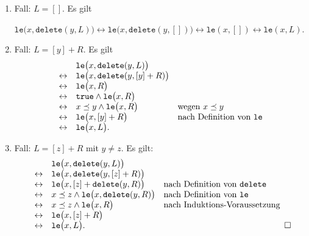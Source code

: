 \begin{enumerate}
\item Fall: $L = []$. Es gilt 

      \hspace*{1.3cm} 
      $\mathtt{le}\bigl(x, \mathtt{delete}(y,L)\bigr) \leftrightarrow \mathtt{le}\bigl(x, \mathtt{delete}(y,[])\bigr) 
       \leftrightarrow \mathtt{le}(x, []) \leftrightarrow \mathtt{le}(x,L)$.
\item Fall: $L = [y] + R$. Es gilt 
      \[
      \begin{array}[b]{cll}
                      & \mathtt{le}\bigl(x,\mathtt{delete}(y,L)\bigr) \\
      \leftrightarrow & \mathtt{le}\bigl(x,\mathtt{delete}(y,[y] + R)\bigr) \\
      \leftrightarrow & \mathtt{le}\bigl(x,R\bigr) \\
      \leftrightarrow & \mathtt{true} \wedge \mathtt{le}\bigl(x,R\bigr) \\
      \leftrightarrow & x \preceq y \wedge \mathtt{le}\bigl(x,R\bigr) & \mbox{wegen $x \preceq y$}\\
      \leftrightarrow & \mathtt{le}\bigl(x,[y] + R\bigr) & \mbox{nach Definition von \texttt{le}}\\
      \leftrightarrow & \mathtt{le}\bigl(x,L\bigr).
      \end{array}
      \]
\item Fall: $L = [z] + R$ mit $y \not= z$.  Es gilt:
       \[ 
       \begin{array}[b]{cll}
                         & \mathtt{le}\bigl(x, \mathtt{delete}(y, L)\bigr)      \\
         \leftrightarrow & \mathtt{le}\bigl(x, \mathtt{delete}(y,[z] + R)\bigr) \\
         \leftrightarrow & \mathtt{le}\bigl(x, [z] + \mathtt{delete}(y,R)\bigr) & 
              \mbox{nach Definition von \texttt{delete}} \\
         \leftrightarrow & x \preceq z \wedge \mathtt{le}\bigl(x, \mathtt{delete}(y,R)\bigr) & 
              \mbox{nach Definition von \texttt{le}} \\
         \leftrightarrow & x \preceq z \wedge \mathtt{le}\bigl(x, R\bigr) & 
              \mbox{nach Induktions-Voraussetzung} \\
         \leftrightarrow & \mathtt{le}\bigl(x, [z] + R\bigr) \\
         \leftrightarrow & \mathtt{le}\bigl(x, L\bigr). 
       \end{array} \hspace*{\fill} \Box
       \]
\end{enumerate}

